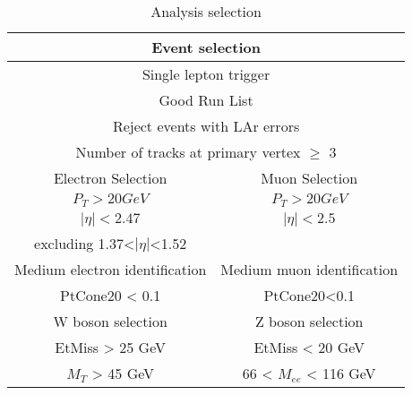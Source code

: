 \begin{table}[h]
    \caption{Analysis selection}
    \label{tab:eventSelection}
    \begin{center}
    \begin{tabular}{ c | c}
        \hline
        \hline
        \multicolumn{2}{c}{Event selection}\\
        \hline
        \multicolumn{2}{c}{Single lepton trigger}\\
        \multicolumn{2}{c}{Good Run List}\\
        \multicolumn{2}{c}{Reject events with LAr errors}\\
        \multicolumn{2}{c}{Number of tracks at primary vertex $\geq$ 3}\\
        \hline
        \hline
        Electron Selection & Muon Selection\\
        \hline

        $P_T>20GeV$ & $P_T>20GeV$\\
        $|\eta|<2.47$ & $|\eta|<2.5$\\
        excluding 1.37<$|\eta|$<1.52 & \\
        Medium electron identification & Medium muon identification \\
        PtCone20 < 0.1 & PtCone20<0.1 \\
        \hline
        \hline
        W boson selection & Z boson selection \\
        \hline
        EtMiss > 25 GeV & EtMiss < 20 GeV \\
        $M_T$ > 45 GeV & 66 < $M_{ee}$ < 116 GeV\\
        \hline
        \hline
    \end{tabular}
    \end{center}
\end{table}
